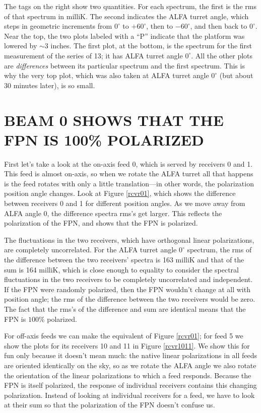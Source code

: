 \documentclass[psfig,preprint]{aastex}
\begin{document}
	The tags on the right show two quantities.  For each spectrum,
the first is the rms of that spectrum in milliK.  The second indicates
the ALFA turret angle, which steps in geometric increments from $0
^\circ$ to $+60 ^\circ$, then to $-60 ^\circ$, and then back to $0
^\circ$.  Near the top, the two plots labeled with a ``P'' indicate that
the platform was lowered by $\sim 3$ inches.  The first plot, at the bottom, is
the spectrum for the first measurement of the series of 13; it has ALFA
turret angle $0 ^\circ$.  All the other plots are {\it differences}
between its particular spectrum and the first spectrum.  This is why the
very top plot, which was also taken at ALFA turret angle $0 ^\circ$ (but
about 30 minutes later), is so small. 

\section{BEAM 0 SHOWS THAT THE FPN IS 100\% POLARIZED} \label{100pol}

	First let's take a look at the on-axis feed 0, which is served
by receivers 0 and 1.  This feed is almost on-axis, so when we rotate
the ALFA turret all that happens is the feed rotates with only a little
translation---in other words, the polarization position angle changes. 
Look at Figure \ref{rcvr01}, which shows the difference between
receivers 0 and 1 for different position angles.  As we move away from
ALFA angle 0, the difference spectra rms's get larger.  This reflects
the polarization of the FPN, and shows that the FPN is polarized. 

	The fluctuations in the two receivers, which have orthogonal
linear polarizations, are completely uncorrelated.  For the ALFA turret
angle $0 ^\circ$ spectrum, the rms of the difference between the two
receivers' spectra is 163 milliK and that of the sum is 164 milliK,
which is close enough to equality to consider the spectral fluctuations
in the two receivers to be completely uncorrelated and independent.  If
the FPN were randomly polarized, then the FPN wouldn't change at all with
position angle; the rms of the difference between the two receivers
would be zero.  The fact that the rms's of the difference and sum are
identical means that the FPN is $100\%$ polarized. 

	For off-axis feeds we can make the equivalent of Figure
\ref{rcvr01}; for feed 5 we show the plots for its receivers 10 and 11
in Figure \ref{rcvr1011}. We show this for fun only because it doesn't
mean much: the native linear polarizations in all feeds are oriented
identically on the sky, so as we rotate the ALFA angle we also rotate
the orientation of the linear polarizations to which a feed responds.
Because the FPN is itself polarized, the response of individual
receivers contains this changing polarization. Instead of looking at
individual receivers for a feed, we have to look at their sum so that
the polarization of the FPN doesn't confuse us.
\end{document}
